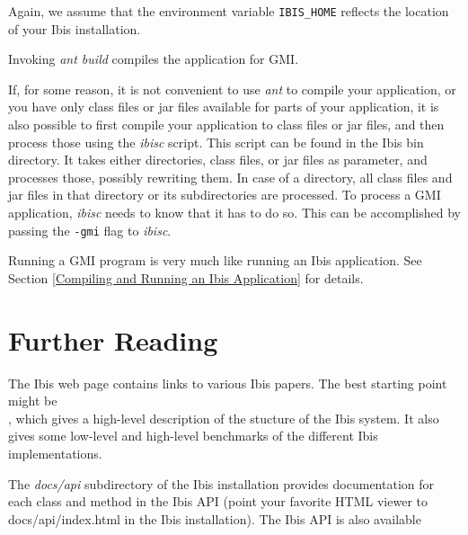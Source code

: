 \documentclass[10pt]{article}
\newcommand{\mysection}[1]{\section{#1}\label{#1}}
\begin{document}
Again, we assume that the environment variable \texttt{IBIS\_HOME} reflects
the location of your Ibis installation.

Invoking \emph{ant build} compiles the application for GMI.

If, for some reason, it is not convenient to use \emph{ant} to compile
your application, or you have only class files or jar files available
for parts of your application, it is also possible to first compile
your application to class files or jar files, and then process those
using the \emph{ibisc} script. This script can be found in the Ibis
bin directory. It takes either directories, class files, or jar files
as parameter, and processes those, possibly rewriting them. In case
of a directory, all class files and jar files in that directory or
its subdirectories are processed.
To process a GMI application, \emph{ibisc} needs to know that it has to
do so.  This can be accomplished by passing the \texttt{-gmi}
flag to \emph{ibisc}.

Running a GMI program is very much like running an Ibis application.
See Section \ref{Compiling and Running an Ibis Application} for details.


\mysection{Further Reading}

The Ibis web page
{}
{}
contains links to various Ibis papers.
The best starting point might be \\
{}
{}, which gives a high-level description of the stucture of the Ibis system.
It also gives some low-level and high-level benchmarks of the different Ibis implementations.

The \emph{docs/api} subdirectory of the Ibis installation provides
documentation for each class and method in the Ibis API (point your favorite
HTML viewer to docs/api/index.html in the Ibis installation).
The Ibis API is also available
\end{document}
